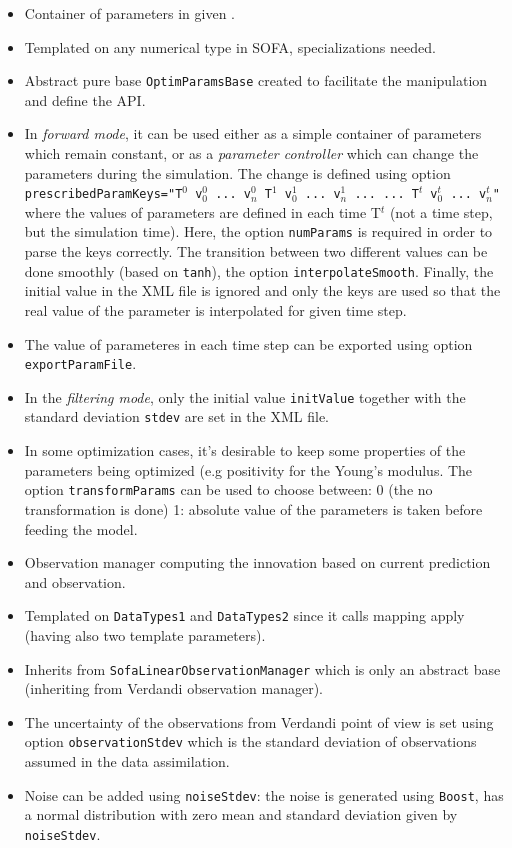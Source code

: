 \documentclass[10pt]{article}
\begin{document}
\begin{itemize}
\item Container of parameters in given \asn. 
\item Templated on any numerical type in SOFA, specializations needed.
\item Abstract pure base \texttt{OptimParamsBase} created to facilitate the manipulation and define the API.
\item In \emph{forward mode}, it can be used either as a simple container of parameters which remain constant, or as a \emph{parameter controller} which can change 
the parameters during the simulation. The change is defined using option \texttt{prescribedParamKeys="T$^0$ v$_0^0$ ... v$_n^0$  T$^1$ v$_0^1$ ... v$_n^1$ ... ... T$^t$ v$^t_0$ ... v$^t_n$"} where the 
values of parameters are defined in each time T$^t$ (not a time step, but the simulation time). Here, the option \texttt{numParams} is required in order to parse the keys correctly. 
The transition between two different values can be done smoothly (based on \texttt{tanh}), the option \texttt{interpolateSmooth}.
Finally, the initial value in the XML  file is ignored and only the keys are used so that the 
real value of the parameter is interpolated for given time step.
\item The value of parameteres in each time step can be exported using option \texttt{exportParamFile}.
\item In the \emph{filtering mode}, only the initial value \texttt{initValue} together with the standard deviation \texttt{stdev} are set in the XML file.
\item In some optimization cases, it's desirable to keep some properties of the parameters being optimized (e.g positivity for the Young's modulus. 
The option \texttt{transformParams} can be used to choose between: 0 (the no transformation is done) 1: absolute value of the parameters is taken
before feeding the model.
\end{itemize}
\medskip
{\large\mobs}
\begin{itemize}
\item Observation manager computing the innovation based on current prediction and observation.
\item Templated on \texttt{DataTypes1} and \texttt{DataTypes2} since it calls mapping apply (having also two template parameters).
\item Inherits from \texttt{SofaLinearObservationManager} which is only an abstract base (inheriting from Verdandi observation manager).
\item The uncertainty of the observations from Verdandi point of view is set using option \texttt{observationStdev} which is the standard deviation of
observations assumed in the data assimilation. 
\item Noise can be added using \texttt{noiseStdev}: the noise is generated using \texttt{Boost}, has a normal distribution with zero mean and standard
deviation given by \texttt{noiseStdev}. 
\end{itemize}
\end{document}

